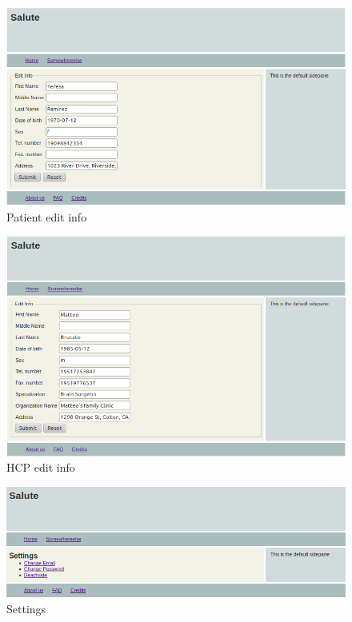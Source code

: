 \documentclass[10pt]{report}
\begin{document}
\begin{figure}
\includegraphics[scale=0.6]{screenshots/pat_info.png}
\caption{Patient edit info}
\end{figure}

\begin{figure}
\includegraphics[scale=0.6]{screenshots/hcp_edit_info.png}
\caption{HCP edit info}
\end{figure}

\begin{figure}
\includegraphics[scale=0.6]{screenshots/Settings.png}
\caption{Settings}
\end{figure}
\end{document}
